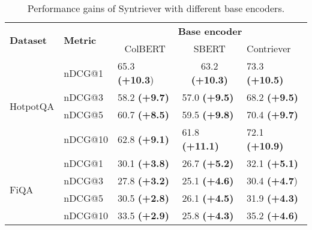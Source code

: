 \begin{table}[t!]
\begin{adjustbox}{width=.45\textwidth,center}
\begin{tabular}{l|l|lll}
\hline
\multirow{2}{*}{\textbf{Dataset}} & \multirow{2}{*}{\textbf{Metric}} & \multicolumn{3}{c}{\textbf{Base encoder}}                                  \\ \cline{3-5} 
                                  &                                  & \multicolumn{1}{c|}{ColBERT}  & \multicolumn{1}{c|}{SBERT}        & Contriever   \\ \hline
\multirow{4}{*}{HotpotQA}         & nDCG@1                           & \multicolumn{1}{l|}{65.3 \textbf{(+10.3})} & \multicolumn{1}{c|}{63.2 \textbf{(+10.3)}}  & 73.3 \textbf{(+10.5)} \\
                                  & nDCG@3                           & \multicolumn{1}{l|}{58.2 \textbf{(+9.7)}} & \multicolumn{1}{l|}{57.0 \textbf{(+9.5)}} & 68.2 \textbf{(+9.5)}  \\
                                  & nDCG@5                           & \multicolumn{1}{l|}{60.7 \textbf{(+8.5)}} & \multicolumn{1}{l|}{59.5 \textbf{(+9.8)}} & 70.4 \textbf{(+9.7)}  \\
                                  & nDCG@10                          & \multicolumn{1}{l|}{62.8 \textbf{(+9.1)}} & \multicolumn{1}{l|}{61.8 \textbf{(+11.1)}} & 72.1 \textbf{(+10.9)} \\ \hline
\multirow{4}{*}{FiQA}             & nDCG@1                           & \multicolumn{1}{l|}{30.1 \textbf{(+3.8)}} & \multicolumn{1}{l|}{26.7 \textbf{(+5.2)}}  & 32.1 \textbf{(+5.1)}  \\ 
                                  & nDCG@3                           & \multicolumn{1}{l|}{27.8 \textbf{(+3.2)}} & \multicolumn{1}{l|}{25.1 \textbf{(+4.6)}}  & 30.4 \textbf{(+4.7})  \\
                                  & nDCG@5                           & \multicolumn{1}{l|}{30.5 \textbf{(+2.8)}} & \multicolumn{1}{l|}{26.1 \textbf{(+4.5)}}  & 31.9 \textbf{(+4.3)}  \\
                                  & nDCG@10                          & \multicolumn{1}{l|}{33.5 \textbf{(+2.9)}} & \multicolumn{1}{l|}{25.8 \textbf{(+4.3)}}  & 35.2 \textbf{(+4.6)}  \\ \hline
\end{tabular}
\end{adjustbox}
\caption{Performance gains of Syntriever with different base encoders.}
\label{tab:ablation_retriever}
\end{table}

